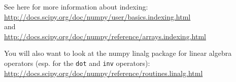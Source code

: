 \documentclass[10pt]{article}
\begin{document}
See here for more information about indexing: \\
\url{http://docs.scipy.org/doc/numpy/user/basics.indexing.html}\\
and\\
\url{http://docs.scipy.org/doc/numpy/reference/arrays.indexing.html}

You will also want to look at the numpy linalg package for linear algebra operators (esp. for the {\tt dot} and {\tt inv} operators):\\
\url{http://docs.scipy.org/doc/numpy/reference/routines.linalg.html}
\end{document}
